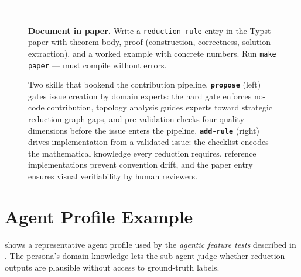 \documentclass{article}
\begin{document}
\begin{figure}[htbp]
\begin{minipage}[t]{0.445\textwidth}
\begin{tcolorbox}
  \rule{\linewidth}{0.3pt}\\[3pt]
  \textbf{Document in paper.}
  Write a \texttt{reduction-rule} entry in the Typst paper with theorem body, proof (construction, correctness, solution extraction), and a worked example with concrete numbers.
  Run \texttt{make paper} --- must compile without errors.
  \end{tcolorbox}
  \label{fig:skill-addrule}
  \end{minipage}
  \caption{Two skills that bookend the contribution pipeline.
    \textbf{\texttt{propose}} (left) gates issue creation by domain experts: the hard gate enforces no-code contribution, topology analysis guides experts toward strategic reduction-graph gaps, and pre-validation checks four quality dimensions before the issue enters the pipeline.
    \textbf{\texttt{add-rule}} (right) drives implementation from a validated issue: the checklist encodes the mathematical knowledge every reduction requires, reference implementations prevent convention drift, and the paper entry ensures visual verifiability by human reviewers.}
  \label{fig:skills}
\end{figure}

\section{Agent Profile Example}\label{app:agent-profile}

 shows a representative agent profile used by the \emph{agentic feature tests} described in . The persona's domain knowledge lets the sub-agent judge whether reduction outputs are plausible without access to ground-truth labels.
\end{document}
